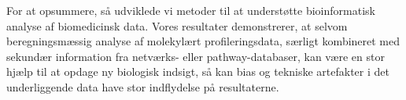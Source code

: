 For at opsummere, så udviklede vi metoder til at understøtte bioinformatisk analyse af biomedicinsk data. Vores resultater demonstrerer, at selvom beregningsmæssig analyse af molekylært profileringsdata, særligt kombineret med sekundær information fra netværks- eller pathway-databaser, kan være en stor hjælp til at opdage ny biologisk indsigt, så kan bias og tekniske artefakter i det underliggende data have stor indflydelse på resultaterne.
